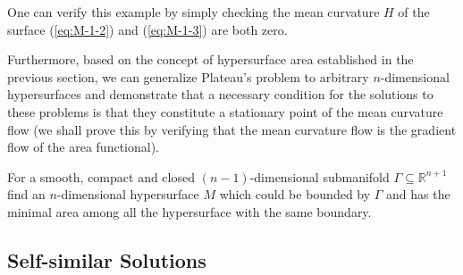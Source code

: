 One can verify this example by simply checking the mean curvature $H$ of the surface (\ref{eq:M-1-2}) and (\ref{eq:M-1-3}) are both zero.

Furthermore, based on the concept of hypersurface area established in the previous section, we can generalize Plateau's problem to arbitrary $n$-dimensional hypersurfaces and demonstrate that a necessary condition for the solutions to these problems is that they constitute a stationary point of the mean curvature flow (we shall prove this by verifying that the mean curvature flow is the gradient flow of the area functional).
\begin{problem}\label{prob:M-1-2}
    For a smooth, compact and closed $(n-1)$-dimensional submanifold $\Gamma\subseteq \mathbb{R}^{n+1}$ find an $n$-dimensional hypersurface $M$ which could be bounded by $\Gamma$ and has the minimal area among all the hypersurface with the same boundary.
\end{problem}


\subsection{Self-similar Solutions}